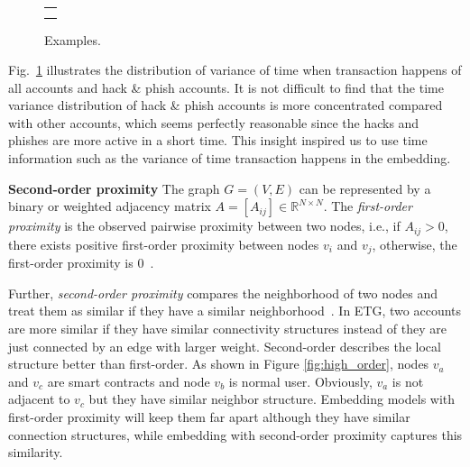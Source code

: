 \begin{figure}[htbp]
\centering
\begin{tabular}{c}
	\subfigure[Histogram of time std for all nodes.]{
		\label{fig:high_order}
    
	}\\
	\subfigure[Histogram of time std for hack\&phish nodes.]{
		\label{fig:asymmetric}
    
	}
\end{tabular}
\caption{Examples.}
\label{fig:time_std}
\end{figure}

Fig.~\ref{fig:time_std} illustrates the distribution of variance of time when transaction happens of all accounts and hack \& phish accounts. It is not difficult to find that the time variance distribution of hack \& phish accounts is more concentrated compared with other accounts, which seems perfectly reasonable since the hacks and phishes are more active in a short time. This insight inspired us to use time information such as the variance of time transaction happens in the embedding.

\textbf{Second-order proximity} The graph $G=(V,E)$ can be represented by a binary or weighted adjacency matrix $A=[A_{ij}]\in \mathbb{R}^{N\times N}$. The \emph{first-order proximity} is the observed pairwise proximity between two nodes, i.e., if $A_{ij}>0$, there exists positive first-order proximity between nodes $v_i$ and $v_j$, otherwise, the first-order proximity is $0$~\cite{tang2015line}.

Further, \emph{second-order proximity} compares the neighborhood of two nodes and treat them as similar if they have a similar neighborhood~\cite{goyal2018graph}. In ETG, two accounts are more similar if they have similar connectivity structures instead of they are just connected by an edge with larger weight. Second-order describes the local structure better than first-order. As shown in Figure \ref{fig:high_order}, nodes $v_a$ and $v_c$ are smart contracts and node $v_b$ is normal user. Obviously, $v_a$ is not adjacent to $v_c$  but they have similar neighbor structure. Embedding models with first-order proximity will keep them far apart although they have similar connection structures, while embedding with second-order proximity captures this similarity.


